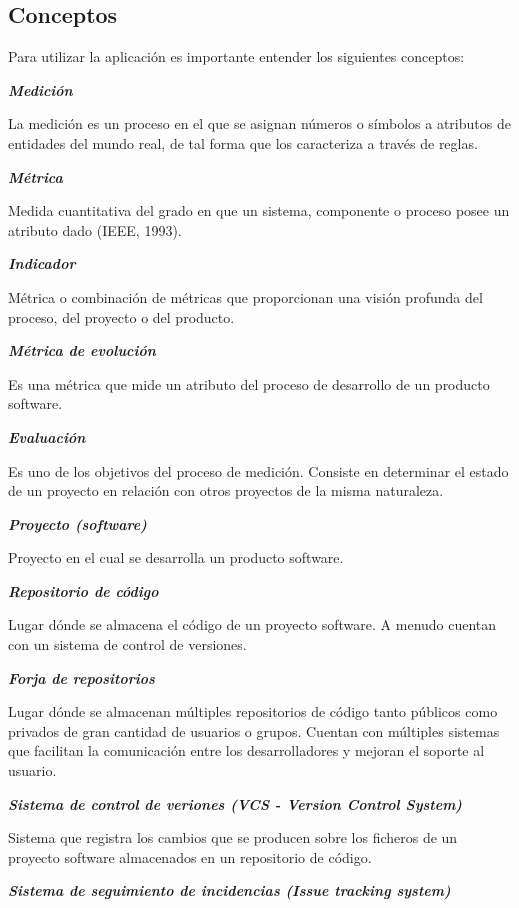 \subsection{Conceptos}
Para utilizar la aplicación es importante entender los siguientes conceptos:

\textbf{\textit{Medición}}

La medición es un proceso en el que se asignan números o símbolos a atributos de entidades del mundo real, de tal forma que los caracteriza a través de reglas.

\textbf{\textit{Métrica}}

Medida cuantitativa del grado en que un sistema, componente o proceso posee un atributo dado (IEEE, 1993).

\textbf{\textit{Indicador}}

Métrica o combinación de métricas que proporcionan una visión profunda del proceso, del proyecto o del producto.

\textbf{\textit{Métrica de evolución}}

Es una métrica que mide un atributo del proceso de desarrollo de un producto software.

\textbf{\textit{Evaluación}}

Es uno de los objetivos del proceso de medición. Consiste en determinar el estado de un proyecto en relación con otros proyectos de la misma naturaleza.

\textbf{\textit{Proyecto (software)}}

Proyecto en el cual se desarrolla un producto software.

\textbf{\textit{Repositorio de código}}

Lugar dónde se almacena el código de un proyecto software. A menudo cuentan con un sistema de control de versiones.

\textbf{\textit{Forja de repositorios}}

Lugar dónde se almacenan múltiples repositorios de código tanto públicos como privados de gran cantidad de usuarios o grupos. Cuentan con múltiples sistemas que facilitan la comunicación entre los desarrolladores y mejoran el soporte al usuario.

\textbf{\textit{Sistema de control de veriones (VCS - Version Control System)}}

Sistema que registra los cambios que se producen sobre los ficheros de un proyecto software almacenados en un repositorio de código.

\textbf{\textit{Sistema de seguimiento de incidencias (Issue tracking system)}}

